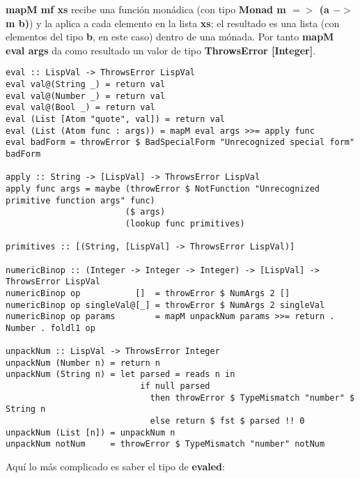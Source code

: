 \textbf{mapM mf xs} recibe una funci\'on mon\'adica (con tipo \textbf{Monad m $=\!>$ (a $-\!>$ m b)}) y la aplica a cada elemento en la lista \textbf{xs}; el resultado es una lista (con elementos del tipo \textbf{b}, en este caso) dentro de una m\'onada. Por tanto \textbf{mapM eval args} da como resultado un valor de tipo \textbf{ThrowsError [Integer]}.\\

\begin{minipage}{\linewidth}
\begin{tiny}
\begin{lstlisting}[frame=single]
eval :: LispVal -> ThrowsError LispVal
eval val@(String _) = return val
eval val@(Number _) = return val
eval val@(Bool _) = return val
eval (List [Atom "quote", val]) = return val
eval (List (Atom func : args)) = mapM eval args >>= apply func
eval badForm = throwError $ BadSpecialForm "Unrecognized special form" badForm

apply :: String -> [LispVal] -> ThrowsError LispVal
apply func args = maybe (throwError $ NotFunction "Unrecognized primitive function args" func)
                        ($ args)
                        (lookup func primitives)

primitives :: [(String, [LispVal] -> ThrowsError LispVal)]

numericBinop :: (Integer -> Integer -> Integer) -> [LispVal] -> ThrowsError LispVal
numericBinop op           []  = throwError $ NumArgs 2 []
numericBinop op singleVal@[_] = throwError $ NumArgs 2 singleVal
numericBinop op params        = mapM unpackNum params >>= return . Number . foldl1 op

unpackNum :: LispVal -> ThrowsError Integer
unpackNum (Number n) = return n
unpackNum (String n) = let parsed = reads n in 
                           if null parsed 
                             then throwError $ TypeMismatch "number" $ String n
                             else return $ fst $ parsed !! 0
unpackNum (List [n]) = unpackNum n
unpackNum notNum     = throwError $ TypeMismatch "number" notNum
\end{lstlisting}
\end{tiny}
\end{minipage}

Aqu\'i lo m\'as complicado es saber el tipo de \textbf{evaled}:

